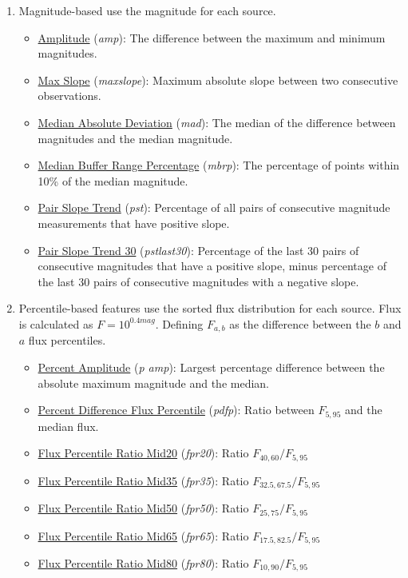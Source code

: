 \documentclass[a4paper,fleqn,usenatbib]{mnras}
\begin{document}
\begin{enumerate}
    \item Magnitude-based use the magnitude for each source.
    \begin{itemize}
        \item \underline{Amplitude} (\textit{amp}): 
        The difference between the maximum and minimum magnitudes.
        \item \underline{Max Slope} (\textit{max\textunderscore slope}): 
        Maximum absolute slope between two consecutive observations.
        \item \underline{Median Absolute Deviation} (\textit{mad}): 
        The median of the difference between magnitudes and the median magnitude.
        \item \underline{Median Buffer Range Percentage} (\textit{mbrp}): 
        The percentage of points within 10\% of the median magnitude.
        \item \underline{Pair Slope Trend} (\textit{pst}): 
        Percentage of all pairs of consecutive magnitude measurements that have positive slope.
        \item \underline{Pair Slope Trend 30} (\textit{pst\textunderscore last30}): 
        Percentage of the last 30 pairs of consecutive magnitudes that have a positive slope, minus percentage of the last 30 pairs of consecutive magnitudes with a negative slope.
    \end{itemize}
    
    \item Percentile-based features use the sorted flux distribution for each source. Flux is calculated as $F = 10^{0.4mag}$. Defining $F_{a,b}$ as the difference between the $b$ and $a$ flux percentiles.
    \begin{itemize}
        \item \underline{Percent Amplitude} (\textit{p \textunderscore amp}): 
        Largest percentage difference between the absolute maximum magnitude and the median.
        \item \underline{Percent Difference Flux Percentile} (\textit{pdfp}): 
        Ratio between $F_{5,95}$ and the median flux.
        \item \underline{Flux Percentile Ratio Mid20} (\textit{fpr20}): 
        Ratio $F_{40,60} / F_{5,95}$
        \item \underline{Flux Percentile Ratio Mid35} (\textit{fpr35}):
        Ratio $F_{32.5,67.5} / F_{5,95}$
        \item \underline{Flux Percentile Ratio Mid50} (\textit{fpr50}): 
        Ratio $F_{25,75} / F_{5,95}$
        \item \underline{Flux Percentile Ratio Mid65} (\textit{fpr65}): 
        Ratio $F_{17.5,82.5} / F_{5,95}$
        \item \underline{Flux Percentile Ratio Mid80} (\textit{fpr80}): 
        Ratio $F_{10,90} / F_{5,95}$
    \end{itemize}
    

\end{enumerate}
\end{document}
